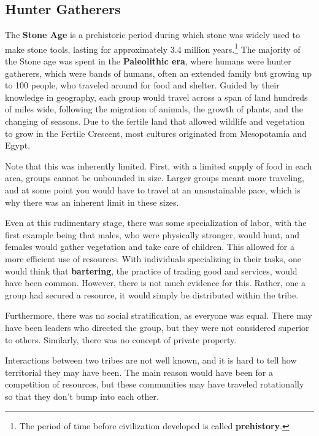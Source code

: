 \documentclass{article}
\begin{document}
  \subsection{Hunter Gatherers}

    The \textbf{Stone Age} is a prehistoric period during which stone was widely used to make stone tools, lasting for approximately 3.4 million years.\footnote{The period of time before civilization developed is called \textbf{prehistory}. } The majority of the Stone age was spent in the \textbf{Paleolithic era}, where humans were hunter gatherers, which were bands of humans, often an extended family but growing up to 100 people, who traveled around for food and shelter. Guided by their knowledge in geography, each group would travel across a span of land hundreds of miles wide, following the migration of animals, the growth of plants, and the changing of seasons. Due to the fertile land that allowed wildlife and vegetation to grow in the Fertile Crescent, most cultures originated from Mesopotamia and Egypt. 

    Note that this was inherently limited. First, with a limited supply of food in each area, groups cannot be unbounded in size. Larger groups meant more traveling, and at some point you would have to travel at an unsustainable pace, which is why there was an inherent limit in these sizes. 

    Even at this rudimentary stage, there was some specialization of labor, with the first example being that males, who were physically stronger, would hunt, and females would gather vegetation and take care of children. This allowed for a more efficient use of resources. With individuals specializing in their tasks, one would think that \textbf{bartering}, the practice of trading good and services, would have been common. However, there is not much evidence for this. Rather, one a group had secured a resource, it would simply be distributed within the tribe. 

    Furthermore, there was no social stratification, as everyone was equal. There may have been leaders who directed the group, but they were not considered superior to others. Similarly, there was no concept of private property. 

    Interactions between two tribes are not well known, and it is hard to tell how territorial they may have been. The main reason would have been for a competition of resources, but these communities may have traveled rotationally so that they don't bump into each other. 
\end{document}
